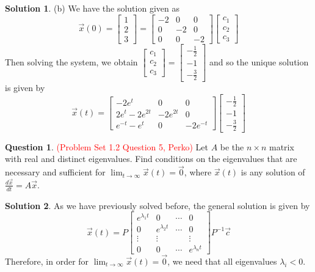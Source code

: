 \documentclass[11pt]{article}
\theoremstyle{definition}\newtheorem{definition}{Definition}
\theoremstyle{definition}\newtheorem{question}{Question}
\theoremstyle{definition}\newtheorem*{solution}{Solution}
\theoremstyle{definition}\newtheorem{example}{Example}
\theoremstyle{definition}\newtheorem{notation}{Notation}
\theoremstyle{theorem}\newtheorem{theorem}{Theorem}
\theoremstyle{theorem}\newtheorem{corollary}{Corollary}
\theoremstyle{theorem}\newtheorem{lemma}{Lemma}
\theoremstyle{theorem}\newtheorem{proposition}{Proposition}
\begin{document}
\begin{solution}
    (b) We have the solution given as
    \begin{equation*}
        \vec{x}(0) = \begin{bmatrix} 1 \\ 2 \\ 3 \end{bmatrix} = \begin{bmatrix} -2 & 0 & 0 \\ 0 & -2 & 0 \\ 0 & 0 & -2 \end{bmatrix}\begin{bmatrix} c_1 \\ c_2 \\ c_3 \end{bmatrix}
    \end{equation*}
    Then solving the system, we obtain $\begin{bmatrix} c_1 \\ c_2 \\ c_3 \end{bmatrix} = \begin{bmatrix} -\frac{1}{2} \\ -1 \\ -\frac{3}{2} \end{bmatrix}$ and so the unique solution is given by
    \begin{equation*}
        \vec{x}(t) = \begin{bmatrix} -2e^t & 0 & 0 \\ 2e^t - 2e^{2t} & -2e^{2t} & 0 \\ e^{-t} - e^t & 0 & -2e^{-t} \end{bmatrix}\begin{bmatrix} -\frac{1}{2} \\ -1 \\ -\frac{3}{2} \end{bmatrix}
    \end{equation*}
\end{solution}

\begin{question}
    \textcolor{red}{(Problem Set 1.2 Question 5, Perko)} Let $A$ be the $n \times n$ matrix with real and distinct eigenvalues. Find conditions on the eigenvalues that are necessary and sufficient for $\lim_{t \to \infty} \vec{x}(t) = \vec{0}$, where $\vec{x}(t)$ is any solution of $\frac{d\vec{x}}{dt} = A\vec{x}$.
\end{question}

\begin{solution}
    As we have previously solved before, the general solution is given by
    \begin{equation*}
        \vec{x}(t) = P\begin{bmatrix} e^{\lambda_1t} & 0 & \cdots & 0 \\ 0 & e^{\lambda_2t} & \cdots & 0 \\ \vdots & \vdots & & \vdots \\ 0 & 0 & \cdots & e^{\lambda_n t} \end{bmatrix}P^{-1}\vec{c}
    \end{equation*}
    Therefore, in order for $\lim_{t \to \infty} \vec{x}(t) = \vec{0}$, we need that all eigenvalues $\lambda_i < 0$.
\end{solution}
\end{document}
